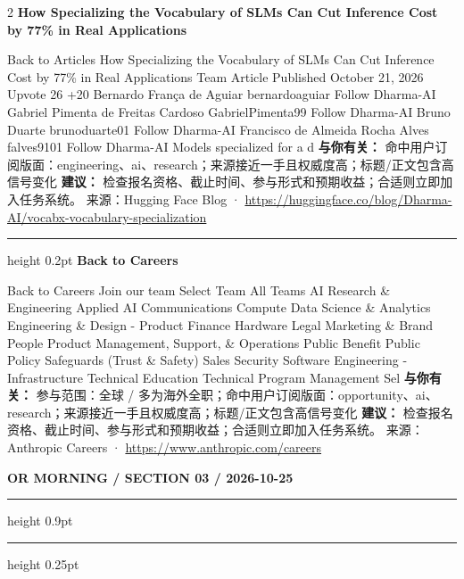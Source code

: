 \documentclass[10.5pt]{ctexart}
\begin{document}
\begin{multicols}{2}
{\large\bfseries How Specializing the Vocabulary of SLMs Can Cut Inference Cost by 77\% in Real Applications}\par
Back to Articles How Specializing the Vocabulary of SLMs Can Cut Inference Cost by 77\% in Real Applications Team Article Published October 21, 2026 Upvote 26 +20 Bernardo França de Aguiar bernardoaguiar Follow Dharma-AI Gabriel Pimenta de Freitas Cardoso GabrielPimenta99 Follow Dharma-AI Bruno Duarte brunoduarte01 Follow Dharma-AI Francisco de Almeida Rocha Alves falves9101 Follow Dharma-AI Models specialized for a d
\textbf{与你有关：} 命中用户订阅版面：engineering、ai、research；来源接近一手且权威度高；标题/正文包含高信号变化
\textbf{建议：} 检查报名资格、截止时间、参与形式和预期收益；合适则立即加入任务系统。
{\footnotesize\color{ormuted} 来源：Hugging Face Blog · \url{https://huggingface.co/blog/Dharma-AI/vocabx-vocabulary-specialization}}
\vspace{2mm}
\hrule height 0.2pt
\vspace{2mm}
{\large\bfseries Back to Careers}\par
Back to Careers Join our team Select Team All Teams AI Research \& Engineering Applied AI Communications Compute Data Science \& Analytics Engineering \& Design - Product Finance Hardware Legal Marketing \& Brand People Product Management, Support, \& Operations Public Benefit Public Policy Safeguards (Trust \& Safety) Sales Security Software Engineering - Infrastructure Technical Education Technical Program Management Sel
\textbf{与你有关：} 参与范围：全球 / 多为海外全职；命中用户订阅版面：opportunity、ai、research；来源接近一手且权威度高；标题/正文包含高信号变化
\textbf{建议：} 检查报名资格、截止时间、参与形式和预期收益；合适则立即加入任务系统。
{\footnotesize\color{ormuted} 来源：Anthropic Careers · \url{https://www.anthropic.com/careers}}
\end{multicols}
\newpage
{\small\bfseries OR MORNING / SECTION 03 / 2026-10-25}
\vspace{2mm}
\hrule height 0.9pt
\vspace{1.5mm}
\hrule height 0.25pt
\vspace{4mm}
\end{document}
